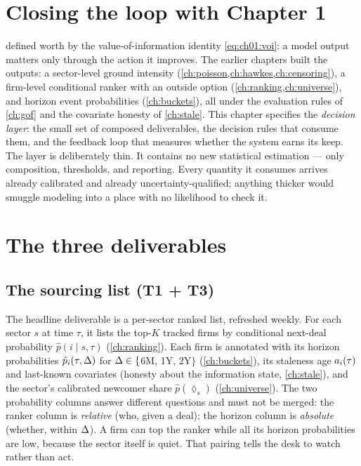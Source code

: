 
\section{Closing the loop with Chapter 1}\label{ch12:sec:loop}

 defined worth by the value-of-information identity
\cref{eq:ch01:voi}: a model output matters only through the action it
improves. The earlier chapters built the outputs: a sector-level
ground intensity (\cref{ch:poisson,ch:hawkes,ch:censoring}), a
firm-level conditional ranker with an outside option
(\cref{ch:ranking,ch:universe}), and horizon event probabilities
(\cref{ch:buckets}), all under the evaluation rules of
\cref{ch:gof} and the covariate honesty of \cref{ch:stale}. This chapter
specifies the \emph{decision layer}: the small set of composed
deliverables, the decision rules that consume them, and the
feedback loop that measures whether the system earns its keep. The
layer is deliberately thin. It contains no new statistical
estimation --- only composition, thresholds, and reporting. Every
quantity it consumes arrives already calibrated and already
uncertainty-qualified; anything thicker would smuggle modeling into a
place with no likelihood to check it.

\section{The three deliverables}\label{ch12:sec:deliverables}

\subsection{The sourcing list (T1 + T3)}

The headline deliverable is a per-sector ranked list, refreshed weekly.
For each sector $s$ at time $\tau$, it lists the top-$K$ tracked firms by
conditional next-deal probability $\hat p(i \mid s, \tau)$
(\cref{ch:ranking}). Each firm is annotated with its horizon probabilities
$\hat p_i(\tau, \Delta)$ for $\Delta \in \{$6M, 1Y, 2Y$\}$
(\cref{ch:buckets}), its staleness age $a_i(\tau)$ and last-known
covariates (honesty about the information state, \cref{ch:stale}), and
the sector's calibrated newcomer share $\hat p(\lozenge_s)$
(\cref{ch:universe}). The two probability columns answer different
questions and must not be merged: the ranker column is \emph{relative}
(who, given a deal); the horizon column is \emph{absolute} (whether,
within $\Delta$). A firm can top the ranker while all its horizon
probabilities are low, because the sector itself is quiet. That pairing
tells the desk to watch rather than act.

